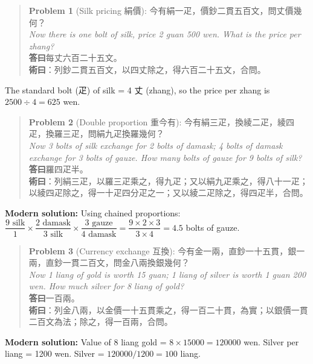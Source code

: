 \documentclass[11pt,a4paper]{article}
\newenvironment{problembox}{%
  \begin{quote}
  \itshape
  \color{problemcolor}
}{%
  \end{quote}
}
\begin{document}
\begin{problembox}
\textbf{Problem 1} (Silk pricing 絹價): 今有絹一疋，價鈔二貫五百文，問丈價幾何？\\[0.2cm]
\textit{Now there is one bolt of silk, price 2 guan 500 wen. What is the price per zhang?}\\[0.2cm]
\textbf{答曰}每丈六百二十五文。\\[0.2cm]
\textbf{術曰}：列鈔二貫五百文，以四丈除之，得六百二十五文，合問。
\end{problembox}

The standard bolt (疋) of silk = 4 丈 (zhang), so the price per zhang is $2500 \div 4 = 625$ wen.

\vspace{0.3cm}

\begin{problembox}
\textbf{Problem 2} (Double proportion 重今有): 今有絹三疋，換綾二疋，綾四疋，換羅三疋，問絹九疋換羅幾何？\\[0.2cm]
\textit{Now 3 bolts of silk exchange for 2 bolts of damask; 4 bolts of damask exchange for 3 bolts of gauze. How many bolts of gauze for 9 bolts of silk?}\\[0.2cm]
\textbf{答曰}羅四疋半。\\[0.2cm]
\textbf{術曰}：列絹三疋，以羅三疋乘之，得九疋；又以絹九疋乘之，得八十一疋；以綾四疋除之，得一十疋四分疋之一；又以綾二疋除之，得四疋半，合問。
\end{problembox}

\textbf{Modern solution:} Using chained proportions: $\dfrac{9 \text{ silk}}{1} \times \dfrac{2 \text{ damask}}{3 \text{ silk}} \times \dfrac{3 \text{ gauze}}{4 \text{ damask}} = \dfrac{9 \times 2 \times 3}{3 \times 4} = 4.5$ bolts of gauze.

\vspace{0.3cm}

\begin{problembox}
\textbf{Problem 3} (Currency exchange 互換): 今有金一兩，直鈔一十五貫，銀一兩，直鈔一貫二百文，問金八兩換銀幾何？\\[0.2cm]
\textit{Now 1 liang of gold is worth 15 guan; 1 liang of silver is worth 1 guan 200 wen. How much silver for 8 liang of gold?}\\[0.2cm]
\textbf{答曰}一百兩。\\[0.2cm]
\textbf{術曰}：列金八兩，以金價一十五貫乘之，得一百二十貫，為實；以銀價一貫二百文為法；除之，得一百兩，合問。
\end{problembox}

\textbf{Modern solution:} Value of 8 liang gold = $8 \times 15000 = 120000$ wen. Silver per liang = 1200 wen. Silver = $120000 / 1200 = 100$ liang.
\end{document}
